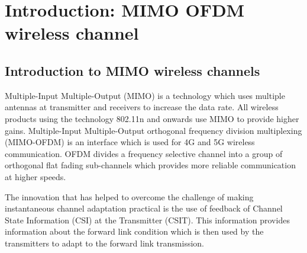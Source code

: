 \documentclass[11pt,a4paper]{report}
\newif\ifpdf
\begin{document}


% 



\newpage
{} %
\tableofcontents
\newpage



\pagestyle{fancy}
\fancyhead[LE]{\leftmark}
\fancyhead[LO]{}
\fancyhead[RO]{\rightmark}
\fancyhead[RE]{}
\fancyfoot[C]{\thepage}
\renewcommand{\headrulewidth}{0.1pt}
\renewcommand{\footrulewidth}{0pt}

\renewcommand{\sectionmark}[1]{%
\markright{\it \thesection \ #1}{}}

\renewcommand{\chaptermark}[1]{%
\markboth{\it \chaptername \ \thechapter.\ #1}{}}

\chapter{Introduction: MIMO OFDM wireless channel}
\label{chap:intro}

\section{Introduction to MIMO wireless channels}
Multiple-Input Multiple-Output (MIMO) is a technology which uses multiple antennas 
at transmitter and receivers to increase the data rate. All wireless products using 
the technology 802.11n and onwards use MIMO to provide higher gains.
Multiple-Input Multiple-Output orthogonal frequency division multiplexing (MIMO-OFDM)
is an interface which is used for 4G and 5G wireless communication. OFDM divides 
a frequency selective channel into a group of orthogonal flat fading sub-channels which
provides more reliable communication at higher speeds. 

The innovation that has helped to overcome the challenge of making instantaneous
channel adaptation practical is the use of feedback of Channel State Information 
(CSI) at the Transmitter (CSIT). This information provides information
about the forward link condition which is then used by the transmitters to 
adapt to the forward link transmission.
\end{document}
